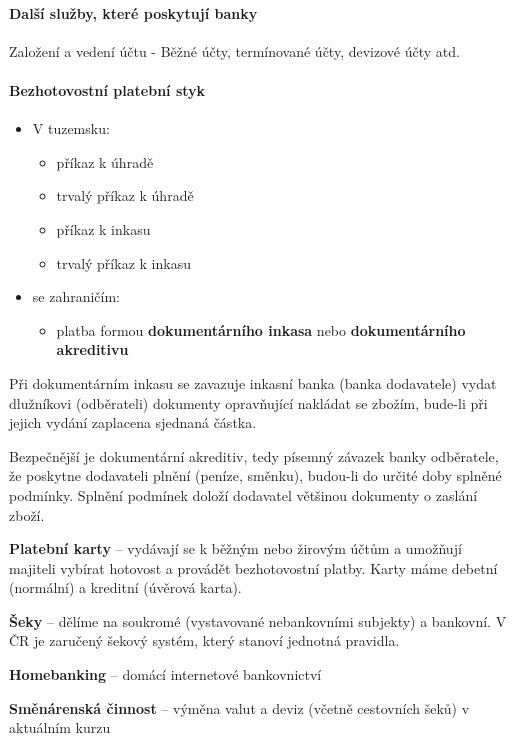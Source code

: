 \paragraph{Další služby, které poskytují banky}
Založení a vedení účtu - Běžné účty, termínované účty, devizové účty atd.

\paragraph{Bezhotovostní platební styk}
\begin{itemize}
    \item V tuzemsku:
        \begin{itemize}
            \item příkaz k úhradě
            \item trvalý příkaz k úhradě
            \item příkaz k inkasu
            \item trvalý příkaz k inkasu
        \end{itemize}
    \item se zahraničím:
        \begin{itemize}
            \item platba formou \textbf{dokumentárního inkasa} nebo \textbf{dokumentárního akreditivu}
        \end{itemize}
\end{itemize}

Při dokumentárním inkasu se zavazuje inkasní banka (banka dodavatele) vydat dlužníkovi (odběrateli) dokumenty opravňující nakládat se zbožím, bude-li při jejich vydání zaplacena sjednaná částka.

Bezpečnější je dokumentární akreditiv, tedy písemný závazek banky odběratele, že poskytne dodavateli plnění (peníze, směnku), budou-li do určité doby splněné podmínky. Splnění podmínek doloží dodavatel většinou dokumenty o zaslání zboží.

\textbf{Platební karty} -- vydávají se k běžným nebo žirovým účtům a umožňují majiteli vybírat hotovost a provádět bezhotovostní platby. Karty máme debetní (normální) a kreditní (úvěrová karta).

\textbf{Šeky} -- dělíme na soukromé (vystavované nebankovními subjekty) a bankovní. V ČR je zaručený šekový systém, který stanoví jednotná pravidla.

\textbf{Homebanking} -- domácí internetové bankovnictví

\textbf{Směnárenská činnost} -- výměna valut a deviz (včetně cestovních šeků) v aktuálním kurzu

